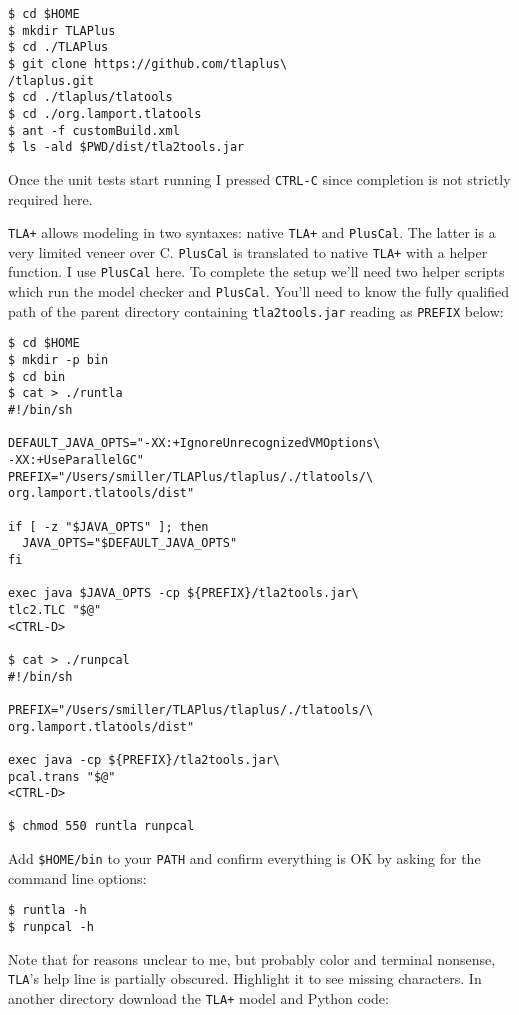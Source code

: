 \documentclass[twocolumn]{article}
\begin{document}
\begin{verbatim}
$ cd $HOME
$ mkdir TLAPlus
$ cd ./TLAPlus
$ git clone https://github.com/tlaplus\
/tlaplus.git
$ cd ./tlaplus/tlatools
$ cd ./org.lamport.tlatools
$ ant -f customBuild.xml
$ ls -ald $PWD/dist/tla2tools.jar
\end{verbatim}

\noindent Once the unit tests start running I pressed \texttt{CTRL-C} since completion is not strictly required here.

\texttt{TLA+} allows modeling in two syntaxes: native \texttt{TLA+} and \texttt{PlusCal}. The latter is a very limited veneer over C. \texttt{PlusCal} is translated to native \texttt{TLA+} with a helper function. I use \texttt{PlusCal} here. To complete the setup we'll need two helper scripts which run the model checker and \texttt{PlusCal}. You'll need to know the fully qualified path of the parent directory containing \texttt{tla2tools.jar} reading as \texttt{PREFIX} below:

\begin{verbatim}
$ cd $HOME
$ mkdir -p bin
$ cd bin
$ cat > ./runtla
#!/bin/sh

DEFAULT_JAVA_OPTS="-XX:+IgnoreUnrecognizedVMOptions\
-XX:+UseParallelGC"
PREFIX="/Users/smiller/TLAPlus/tlaplus/./tlatools/\
org.lamport.tlatools/dist"

if [ -z "$JAVA_OPTS" ]; then
  JAVA_OPTS="$DEFAULT_JAVA_OPTS"
fi

exec java $JAVA_OPTS -cp ${PREFIX}/tla2tools.jar\
tlc2.TLC "$@"
<CTRL-D>

$ cat > ./runpcal
#!/bin/sh

PREFIX="/Users/smiller/TLAPlus/tlaplus/./tlatools/\
org.lamport.tlatools/dist"

exec java -cp ${PREFIX}/tla2tools.jar\
pcal.trans "$@"
<CTRL-D>

$ chmod 550 runtla runpcal
\end{verbatim}

\noindent Add \texttt{\$HOME/bin} to your \texttt{PATH} and confirm everything is OK by asking for the command line options:

\begin{verbatim}
$ runtla -h
$ runpcal -h
\end{verbatim}

\noindent Note that for reasons unclear to me, but probably color and terminal nonsense, \texttt{TLA}'s help line is partially obscured. Highlight it to see missing characters. In another directory download the \texttt{TLA+} model and Python code:
\end{document}
